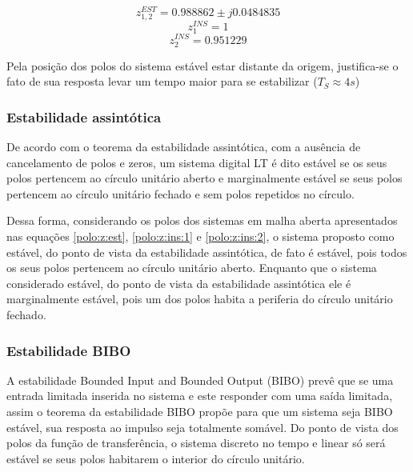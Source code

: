 \begin{equation} \label{polo:z:est}
    z_{1,2}^{EST} = 0.988862 \pm j 0.0484835
\end{equation}
\begin{equation} \label{polo:z:ins:1}
    z_{1}^{INS} = 1
\end{equation}
\begin{equation} \label{polo:z:ins:2}
    z_{2}^{INS} = 0.951229
\end{equation}




Pela posição dos polos do sistema estável estar distante da origem, justifica-se o fato de sua resposta levar um tempo maior para se estabilizar ($T_S \approx 4s$)

\subsubsection{Estabilidade assintótica}

De acordo com o teorema da estabilidade assintótica, com a ausência de cancelamento de polos e zeros, um sistema digital LT é dito estável se os seus polos pertencem ao círculo unitário aberto e marginalmente estável se seus polos pertencem ao círculo unitário fechado e sem polos repetidos no círculo.

Dessa forma, considerando os polos dos sistemas em malha aberta apresentados nas equações \ref{polo:z:est}, \ref{polo:z:ins:1} e \ref{polo:z:ins:2},  o sistema proposto como estável, do ponto de vista da estabilidade assintótica, de fato é estável, pois todos os seus polos pertencem ao círculo unitário aberto. Enquanto que o sistema considerado estável, do ponto de vista da estabilidade assintótica ele é marginalmente estável, pois um dos polos habita a periferia do círculo unitário fechado.

\subsubsection{Estabilidade BIBO}

A estabilidade Bounded Input and Bounded Output (BIBO) prevê que se uma entrada limitada inserida no sistema e este responder com uma saída limitada, assim o teorema da estabilidade BIBO propõe para que um sistema seja BIBO estável, sua resposta ao impulso seja totalmente somável. Do ponto de vista dos polos da função de transferência, o sistema discreto no tempo e linear só será estável se seus polos habitarem o interior do círculo unitário.

